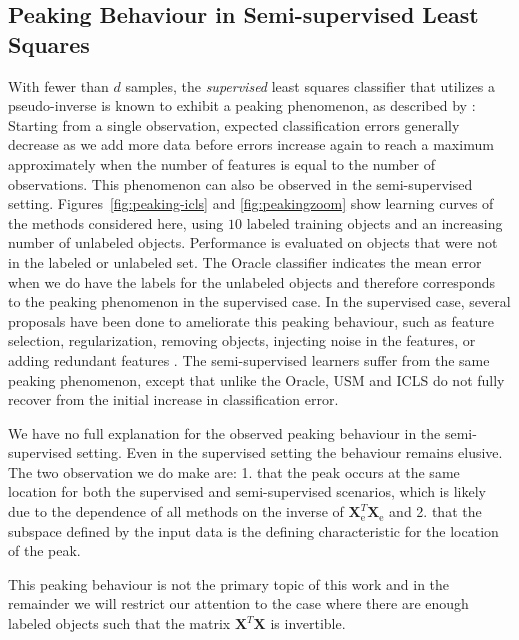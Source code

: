 \documentclass[twoside]{memoir}\usepackage[]{graphicx}\usepackage{xcolor}
\newcommand{\Xe}{\mathbf{X}_\mathrm{e}  }
\newcommand{\XeT}{\mathbf{X}_\mathrm{e}^T}
\newcommand{\featdim}{d}
\begin{document}
\subsection{Peaking Behaviour in Semi-supervised Least Squares}
With fewer than $\featdim$ samples, the \emph{supervised} least squares classifier that utilizes a pseudo-inverse is known to exhibit a peaking phenomenon, as described by \citet{Opper1995,Raudys1998}: Starting from a single observation, expected classification errors generally decrease as we add more data before errors increase again to reach a maximum approximately when the number of features is equal to the number of observations. This phenomenon can also be observed in the semi-supervised setting. Figures~\ref{fig:peaking-icls} and \ref{fig:peakingzoom} show learning curves of the methods considered here, using $10$ labeled training objects and an increasing number of unlabeled objects. Performance is evaluated on objects that were not in the labeled or unlabeled set. The Oracle classifier indicates the mean error when we do have the labels for the unlabeled objects and therefore corresponds to the peaking phenomenon in the supervised case. In the supervised case, several proposals have been done to ameliorate this peaking behaviour, such as feature selection, regularization, removing objects, injecting noise in the features, or adding redundant features \citep{Skurichina1999}. The semi-supervised learners suffer from the same peaking phenomenon, except that unlike the Oracle, USM and ICLS do not fully recover from the initial increase in classification error.

We have no full explanation for the observed peaking behaviour in the semi-supervised setting. Even in the supervised setting the behaviour remains elusive. The two observation we do make are: 1. that the peak occurs at the same location for both the supervised and semi-supervised scenarios, which is likely due to the dependence of all methods on the inverse of $\XeT \Xe$ and 2. that the subspace defined by the input data is the defining characteristic for the location of the peak.

This peaking behaviour is not the primary topic of this work and in the remainder we will restrict our attention to the case where there are enough labeled objects such that the matrix $\mathbf{X}^T \mathbf{X}$ is invertible. 
\end{document}
